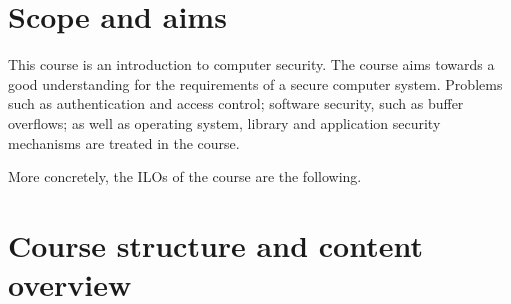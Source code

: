 \mode*

\section{Scope and aims}%
\label{sec:aim}


This course is an introduction to computer security.
The course aims towards a good understanding for the requirements of a secure 
computer system.
Problems such as authentication and access control; software security, such as 
buffer overflows; as well as operating system, library and application security 
mechanisms are treated in the course.


More concretely, the \acp{ILO} of the course are the following.



\section{Course structure and content overview}%
\label{sec:outline}


